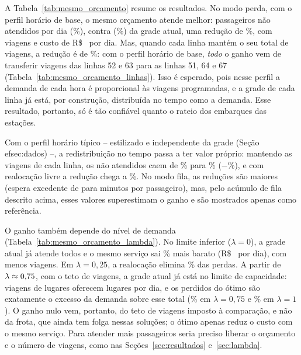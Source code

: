 \documentclass[11pt,a4paper]{article}
\newcommand{\tabela}[1]{\resizebox{\ifdim\width>\textwidth\textwidth\else\width\fi}{!}{}}
\begin{document}
A Tabela~\ref{tab:mesmo_orcamento} resume os resultados. No modo perda, com o
perfil horário de base, o mesmo orçamento atende melhor:
\moPerdidosOtimo{} passageiros não atendidos por dia (\moPctOtimo\%), contra
\moPerdidosGTFS{} (\moPctGTFS\%) da grade atual, uma redução de
\moReducaoPerda\%, com \moViagensOtimo{} viagens e custo de
R\$~\moCustoOtimo{} por dia. Mas, quando cada linha mantém o seu total de
viagens, a redução é de \moReducaoPerdaFixa\%: com o perfil horário de base, \emph{todo} o
ganho vem de transferir viagens das linhas 52 e 63 para as linhas 51, 64 e 67
(Tabela~\ref{tab:mesmo_orcamento_linhas}). Isso é esperado, pois nesse perfil a
demanda de cada hora é proporcional às viagens programadas, e a grade de cada
linha já está, por construção, distribuída no tempo como a demanda. Esse
resultado, portanto, só é tão confiável quanto o rateio dos embarques das
estações.

Com o perfil horário típico -- estilizado e independente da grade
(Seção~
ef{sec:dados}) --, a redistribuição no tempo
passa a ter valor próprio: mantendo as viagens de cada linha, os não atendidos
caem de \moPctGTFSTipico\% para \moPctTipicoFixa\% ($-$\moReducaoTipicoFixa\%), e
com realocação livre a redução chega a \moReducaoTipico\%. No modo fila, as
reduções são maiores (espera excedente de \moEsperaGTFS{} para \moEsperaOtimo{} minutos por
passageiro), mas, pelo acúmulo de fila descrito acima, esses valores
superestimam o ganho e são mostrados apenas como referência.

\begin{table}[htbp]
\centering
\caption{Grade atual $\times$ solução ótima a orçamento igual, por linha (modo perda, $\lambda=\lambdaCentral$, realocação livre).}
\label{tab:mesmo_orcamento_linhas}
\small
\tabela{tabelas/mesmo_orcamento_linhas.tex}
\end{table}

O ganho também depende do nível de demanda (Tabela~\ref{tab:mesmo_orcamento_lambda}).
No limite inferior ($\lambda=0$), a grade atual já atende todos e o mesmo
serviço sai \moEconomiaLambdaZero\% mais barato (R\$~\moCustoLambdaZero{} por
dia), com menos viagens. Em $\lambda=0{,}25$, a realocação elimina
\moReducaoQuarto\% das perdas. A partir de $\lambda\approx0{,}75$,
com o teto de \viagensGTFS{} viagens, a grade atual já está no limite de
capacidade: \viagensGTFS{} viagens de \capArticulado{} lugares oferecem
\capGradeLugares{} lugares por dia, e os perdidos do ótimo são exatamente o
excesso da demanda sobre esse total (\moPctLambdaTresQuartos\% em
$\lambda=0{,}75$ e \moPctLambdaUm\% em $\lambda=1$). O ganho nulo vem, portanto,
do teto de viagens imposto à comparação, e não da frota, que ainda tem folga
nessas soluções; o ótimo apenas reduz o custo com o mesmo serviço. Para atender
mais passageiros seria preciso liberar o orçamento e o número de viagens, como
nas Seções~\ref{sec:resultados} e~\ref{sec:lambda}.
\end{document}
